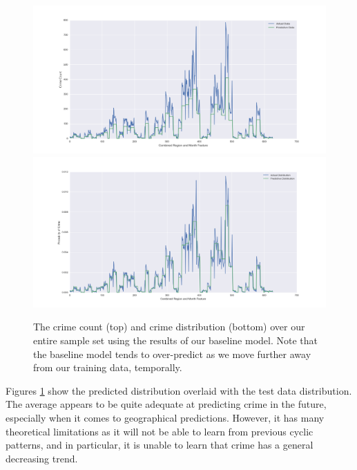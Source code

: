 \documentclass[letterpaper, 11 pt, conference]{ieeeconf}  %
\begin{document}
\begin{figure}
\centering
\includegraphics[scale=0.11]{baselines_count}
\includegraphics[scale=0.11]{baselines_distribution}
\caption{The crime count (top) and crime distribution (bottom) over our entire sample set using the results of our baseline model. Note that the baseline model tends to over-predict as we move further away from our training data, temporally.} 
\label{fig:baseline_results}
\end{figure}
Figures \ref{fig:baseline_results} show the predicted distribution overlaid with the test data distribution. The average appears to be quite adequate at predicting crime in the future, especially when it comes to geographical predictions. However, it has many theoretical limitations as it will not be able to learn from previous cyclic patterns, and in particular, it is unable to learn that crime has a general decreasing trend. 
\end{document}
